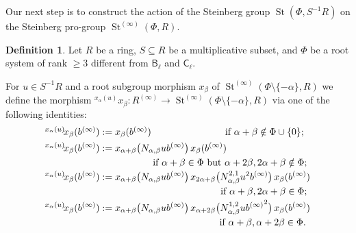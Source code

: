 \documentclass[oneside, 11pt]{amsart}
\numberwithin{equation}{section}
\theoremstyle{definition}
\newtheorem{df}[lemma]{Definition} \Crefname{df}{Definition}{Definitions}
\theoremstyle{remark}
\DeclareMathOperator\St{St}
\newcommand{\up}[2]{{^{#1}\!{#2}}}
\newcommand{\rB}{\mathsf{B}}
\newcommand{\rC}{\mathsf{C}}
\begin{document}
Our next step is to construct the action of the Steinberg group $\St(\Phi, S^{-1}R)$ on the Steinberg pro-group $\St^{(\infty)}(\Phi, R)$.
\begin{df}\label{root-action}
 Let \(R\) be a ring, \(S \subseteq R\) be a multiplicative subset, and \(\Phi\) be a root system of rank \(\geq 3\) different from \(\rB_\ell\) and \(\rC_\ell\).
 
 For $u \in S^{-1}R$ and a root subgroup morphism $x_\beta$ of $\St^{(\infty)}(\Phi\setminus\{-\alpha\}, R)$ we define the morphism 
 $\up{x_\alpha(u)}x_\beta \colon R^{(\infty)} \to \St^{(\infty)}(\Phi\setminus\{-\alpha\}, R)$
 via one of the following identities:
 \begin{align} 
 \multispan2{$\up{x_\alpha(u)}{x_\beta(b^{(\infty)})} := x_\beta(b^{(\infty)})$ \hfill if $\alpha + \beta \notin \Phi \cup \{0\}$;} \label{eq:action-R2} \\
 \up{x_\alpha(u)}{x_\beta(b^{(\infty)})}
 &:= x_{\alpha + \beta}\bigl(N_{\alpha, \beta} u b^{(\infty)}\bigr)\, x_\beta(b^{(\infty)}) \label{eq:action-R3} \\
 \multispan2{\hfill if $\alpha + \beta \in \Phi$ but $\alpha + 2\beta, 2\alpha + \beta \notin \Phi$;} \nonumber \\
 \up{x_\alpha(u)}{x_\beta(b^{(\infty)})}
 &:= x_{\alpha + \beta}\bigl(N_{\alpha, \beta} u b^{(\infty)}\bigr)\,
  x_{2\alpha + \beta}\bigl(N^{2,1}_{\alpha, \beta} u^2 b^{(\infty)}\bigr)\,
  x_\beta(b^{(\infty)}) \label{eq:action-R4a} \\
 \multispan2{\hfill if $\alpha + \beta, 2\alpha + \beta \in \Phi$;} \nonumber \\
 \up{x_\alpha(u)}{x_\beta(b^{(\infty)})}
 &:= x_{\alpha + \beta}\bigl(N_{\alpha, \beta} u b^{(\infty)}\bigr)\,
  x_{\alpha + 2\beta}\bigl(N^{1,2}_{\alpha, \beta} u {b^{(\infty)}}^2\bigr)\,
  x_\beta(b^{(\infty)}) \label{eq:action-R4b} \\
 \multispan2{\hfill if $\alpha + \beta, \alpha + 2\beta \in \Phi$.} \nonumber
 \end{align} 
\end{df}
\end{document}
